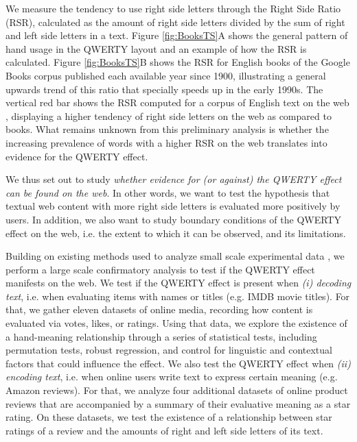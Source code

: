 \documentclass[letterpaper]{sig-alternate-2013}
\begin{document}
We measure the tendency to use right side letters through the Right Side Ratio
(RSR), calculated as the amount of right side letters divided by the sum of
right and left side letters in a text. Figure \ref{fig:BooksTS}A shows the
general pattern of hand usage in the QWERTY layout and an example of how the
RSR is calculated.  Figure \ref{fig:BooksTS}B shows the RSR for English books
of the Google Books corpus \cite{Lin2012} published each available year since
1900, illustrating a general upwards trend of this ratio that specially speeds
up in the early 1990s. The vertical red bar shows the RSR computed for a
corpus of English text on the web \cite{Jakubivcek2013}, displaying a higher
tendency of right side letters on the web as compared to books. What remains
unknown from this preliminary analysis is whether the increasing prevalence of
words with a higher RSR on the web translates into evidence for the QWERTY
effect.

We thus set out to study \emph{whether evidence for (or against) the QWERTY
effect can be found on the web}. In other words, we  want to test
the hypothesis that textual web content with more right side letters is
evaluated more positively by users. In addition, we also want to study
boundary conditions of the QWERTY effect on the web, i.e. the extent to which
it can be observed, and its limitations.

Building on existing methods used to analyze small scale experimental data
\cite{Casasanto2014}, we perform a large scale confirmatory analysis to test
if the QWERTY effect manifests on the web. We test if the QWERTY effect is
present when \emph{(i) decoding text}, i.e. when evaluating items with names
or titles (e.g. IMDB movie titles). For that, we gather eleven datasets of
online media, recording how content is evaluated via votes, likes, or ratings.
Using that data, we explore the existence of a hand-meaning relationship
through a series of statistical tests, including permutation tests, robust
regression, and control for linguistic and contextual factors that could
influence the effect. We also test the QWERTY effect when \emph{(ii) encoding
text}, i.e. when online users write text to express certain meaning (e.g.
Amazon reviews). For that, we analyze four additional datasets of online product reviews
that are accompanied by a summary of their evaluative meaning as a star
rating. On these datasets, we test the existence of a relationship between
star ratings of a review and the amounts of right and left side letters of its
text.
\end{document}
